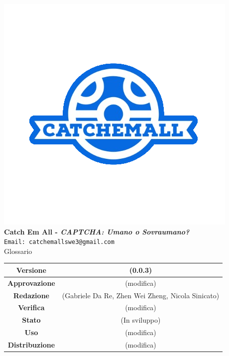 \begin{titlepage}
\begin{center}
		\includegraphics[scale = 1.5]{img/logo.png}\\
		\bigskip
		\large \textbf{Catch Em All - \textit{CAPTCHA: Umano o Sovraumano?}}\\
		\texttt{Email: catchemallswe3@gmail.com}\\
		\vfill
		{\fontsize{1.5cm}{0}\selectfont Glossario}\\
		\vfill
		\renewcommand\tabularxcolumn[1]{>{\Centering}m{#1}}
		\begin{tabularx}{\textwidth}{|c|c|}
			\hline
			\textbf{Versione}      & (0.0.3)                                          \\
			\hline
			\textbf{Approvazione}  & (modifica)                                       \\
			\hline
			\textbf{Redazione}     & (Gabriele Da Re, Zhen Wei Zheng, Nicola Sinicato) \\
			\hline
			\textbf{Verifica}      & (modifica)                                       \\
			\hline
			\textbf{Stato}         & (In sviluppo)                                    \\
			\hline
			\textbf{Uso}           & (modifica)                                       \\
			\hline
			\textbf{Distribuzione} & (modifica)                                       \\
			\hline
		\end{tabularx}
	\end{center}
\end{titlepage} 